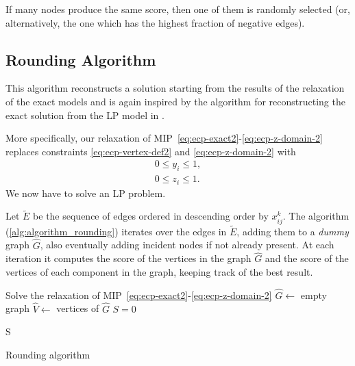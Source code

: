 If many nodes produce the same score, then one of them is
randomly selected (or, alternatively, the one which has the highest fraction of
negative edges).

\subsection{Rounding Algorithm}%
\label{ssub:rounding_algorithm}

This algorithm reconstructs a solution starting from the results of the
relaxation of the exact models and is again inspired by the algorithm for
reconstructing the exact solution from the \acrshort{LP} model in
\cite{charikar2000greedy}.

More specifically, our relaxation of
MIP~\eqref{eq:ecp-exact2}-\eqref{eq:ecp-z-domain-2} replaces constraints
\eqref{eq:ecp-vertex-def2} and \eqref{eq:ecp-z-domain-2} with
\begin{gather}
	0 \leq y_i \leq 1, \\
	0 \leq z_i \leq 1.
\end{gather}
We now have to solve an \acrshort{LP} problem.

Let $\tilde{E}$ be the sequence of edges ordered in descending order by $x_{ij}
		^{k} $. The algorithm (\autoref{alg:algorithm_rounding}) iterates over
the edges in $\tilde{E}$, adding them to a \emph{dummy} graph $\hat{G}$, also eventually
adding incident nodes if not already present. At each iteration it computes
the score of the vertices in the graph $\hat{G}$ and the score
of the vertices of each component in the graph, keeping track of the best
result.

\begin{algorithm}
	\SetAlgoLined
	Solve the relaxation of MIP~\eqref{eq:ecp-exact2}-\eqref{eq:ecp-z-domain-2}
	\;
	$\hat{G} \leftarrow $ empty graph \;
	$\hat{V} \leftarrow $ vertices of $\hat{G}$ \;
	$S = 0$


	\Return S \;
	\caption{Rounding algorithm}
	\label{alg:algorithm_rounding}
\end{algorithm}

